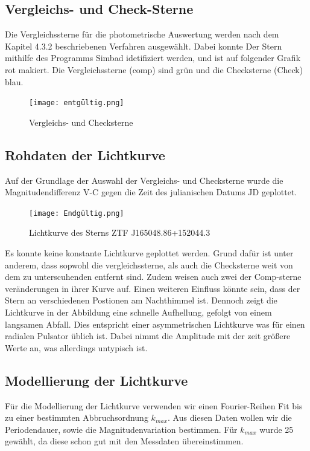 \documentclass[ngerman,ruledheaders=section,class=report,thesis={type=Protokoll},accentcolor=1b,marginpar=false,parskip=half-,fontsize=11pt,]{tudapub}
\begin{document}
	\subsection{Vergleichs- und Check-Sterne}
	Die Vergleichssterne für die photometrische Auswertung werden nach dem Kapitel 4.3.2 beschriebenen Verfahren ausgewählt. Dabei konnte Der Stern mithilfe des Programms Simbad idetifiziert werden, und ist auf folgender Grafik rot makiert. Die Vergleichssterne (comp) sind grün und die Checksterne (Check) blau.
	
	\begin{figure}[h]
		\centering
		\texttt{[image: entgültig.png]}
		\caption{Vergleichs- und Checksterne}
		\label{Abbildung 4.43}
	\end{figure}
	
	



	\subsection{Rohdaten der Lichtkurve}
	Auf der Grundlage der Auswahl der Vergleichs- und Checksterne wurde die Magnitudendifferenz V-C gegen die Zeit des julianischen Datums JD geplottet.
	
	\begin{figure}[h]
		\centering
		\texttt{[image: Endgültig.png]}
		\caption{Lichtkurve des Sterns ZTF J165048.86+152044.3}
		\label{Abbildung 4.44}
	\end{figure}

	Es konnte keine konstante Lichtkurve geplottet werden. Grund dafür ist unter anderem, dass sopwohl die vergleichssterne, als auch die Checksterne weit von dem zu unterscuhenden entfernt sind. Zudem weisen auch zwei der Comp-sterne veränderungen in ihrer Kurve auf. Einen weiteren Einfluss könnte sein, dass der Stern an verschiedenen Postionen am Nachthimmel ist.
Dennoch zeigt die Lichtkurve in der Abbildung eine schnelle Aufhellung, gefolgt von einem langsamen Abfall. Dies entspricht einer asymmetrischen Lichtkurve was für einen radialen Pulsator üblich ist. Dabei nimmt die Amplitude mit der zeit größere Werte an, was allerdings untypisch ist.

	\subsection{Modellierung der Lichtkurve}
	Für die Modellierung der Lichtkurve verwenden wir einen Fourier-Reihen Fit bis zu einer bestimmten Abbruchsordnung $k_{max}$. Aus diesen Daten wollen wir die Periodendauer, sowie die Magnitudenvariation bestimmen.
	Für $k_{max}$ wurde 25 gewählt, da diese schon gut mit den Messdaten übereinstimmen.
\end{document}
